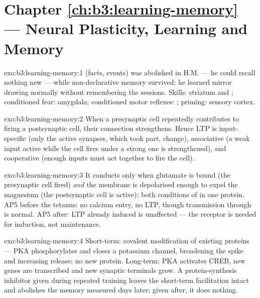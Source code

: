 \section*{Chapter \ref{ch:b3:learning-memory} --- Neural Plasticity, Learning and Memory}

\begin{solution}{exo:b3:learning-memory:1}
 (facts, events) was abolished in H.M. --- he could
recall nothing new --- while non-declarative memory survived: he learned
mirror drawing normally without remembering the sessions. Skills:
striatum and ; conditioned fear: amygdala; conditioned motor
reflexes: ; priming: sensory cortex.
\end{solution}

\begin{solution}{exo:b3:learning-memory:2}
When a presynaptic cell repeatedly contributes to firing a postsynaptic
cell, their connection strengthens. Hence LTP is input-specific (only
the active synapses, which took part, change), associative (a weak
input active while the cell fires under a strong one is strengthened),
and cooperative (enough inputs must act together to fire the cell).
\end{solution}

\begin{solution}{exo:b3:learning-memory:3}
It conducts only when glutamate is bound (the presynaptic cell fired)
\emph{and} the membrane is depolarised enough to expel the magnesium
(the postsynaptic cell is active): both conditions of  in
one protein. AP5 before the tetanus: no calcium entry, no LTP, though
transmission through  is normal. AP5 after: LTP already
induced is unaffected --- the receptor is needed for induction, not
maintenance.
\end{solution}

\begin{solution}{exo:b3:learning-memory:4}
Short-term: covalent modification of existing proteins --- PKA
phosphorylates and closes a potassium channel, broadening the spike
and increasing release; no new protein. Long-term: PKA activates CREB,
new genes are transcribed and new synaptic terminals grow. A
protein-synthesis inhibitor given during repeated training leaves the
short-term facilitation intact and abolishes the memory measured days
later; given after, it does nothing.
\end{solution}

